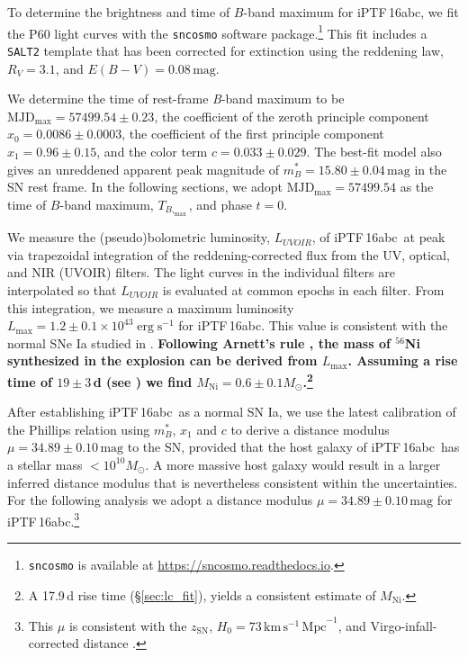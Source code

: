 \documentclass[twocolumn]{aastex61}
\newcommand{\sm}{M_\odot}
\newcommand{\abc}{iPTF\,16abc}
\begin{document}
To determine the brightness and time of $B$-band maximum for \abc, we fit the
P60 light curves with the \texttt{sncosmo} software
package.\footnote{\texttt{sncosmo} is available at
\url{https://sncosmo.readthedocs.io}.} This fit includes a \texttt{SALT2}
template \citep{2007A&A...466...11G} that has been corrected for extinction
using the \citet{1999PASP..111...63F} reddening law, $R_V=3.1$, and $E(B-V) =
0.08 \, \mathrm{mag}$.

We determine the time of rest-frame \textit{B}-band maximum to be
$\textrm{MJD}_\mathrm{max}=57499.54\pm0.23$, the coefficient of the zeroth
principle component $x_0 = 0.0086 \pm 0.0003$, the coefficient of the first
principle component $x_1 = 0.96 \pm 0.15$, and the color term $c = 0.033 \pm
0.029$. The best-fit model also gives an unreddened apparent peak magnitude of
$m^*_{B}=15.80 \pm 0.04 \,\textrm{mag}$ in the SN rest frame. In the following
sections, we adopt $\textrm{MJD}_\mathrm{max}=57499.54$ as the time of
$B$-band maximum, $T_{B,_\mathrm{max}}$, and phase $t=0$.

We measure the (pseudo)bolometric luminosity, $L_{UVOIR}$, of \abc\ at peak
via trapezoidal integration of the reddening-corrected flux from the UV,
optical, and NIR (UVOIR) filters. The light curves in the individual filters
are interpolated so that $L_{UVOIR}$ is evaluated at common epochs in each
filter. From this integration, we measure a maximum luminosity $L_\mathrm{max}
= 1.2 \pm 0.1 \times 10^{43} \; \mathrm{erg \; s}^{-1}$ for \abc. This value
is consistent with the normal SNe Ia studied in \citet{2016A&A...588A..84D}.
\textbf{Following Arnett's rule \citep{1982ApJ...253..785A,
1985Natur.314..337A}, the mass of $^{56}$Ni synthesized in the explosion can
be derived from $L_\mathrm{max}$. Assuming a rise time of $19 \pm 3$\,d (see
\citealt{2006A&A...450..241S}) we find $M_\mathrm{Ni} = 0.6 \pm 0.1
M_\odot$.\footnote{A 17.9\,d rise time (\S\ref{sec:lc_fit}),
yields a consistent estimate of $M_\mathrm{Ni}$.}}

After establishing \abc\ as a normal SN Ia, we use the latest calibration
\citep{2014A&A...568A..22B} of the Phillips relation
\citep{1993ApJ...413L.105P} using $m^*_{B}$, $x_1$ and $c$ to derive a
distance modulus $\mu = 34.89 \pm 0.10 \,\textrm{mag}$ to the SN, provided
that the host galaxy of \abc\ has a stellar mass $< 10^{10}\sm$. A more
massive host galaxy would result in a larger inferred distance modulus that is
nevertheless consistent within the uncertainties. For the following analysis
we adopt a distance modulus $\mu = 34.89 \pm 0.10 \,\textrm{mag}$ for
\abc.\footnote{This $\mu$ is consistent with the $z_\mathrm{SN}$, $H_0 = 73 \,
\mathrm{km \, s^{-1} \, Mpc}^{-1}$, and Virgo-infall-corrected distance
\citep{2000ApJ...529..786M}.}
\end{document}
